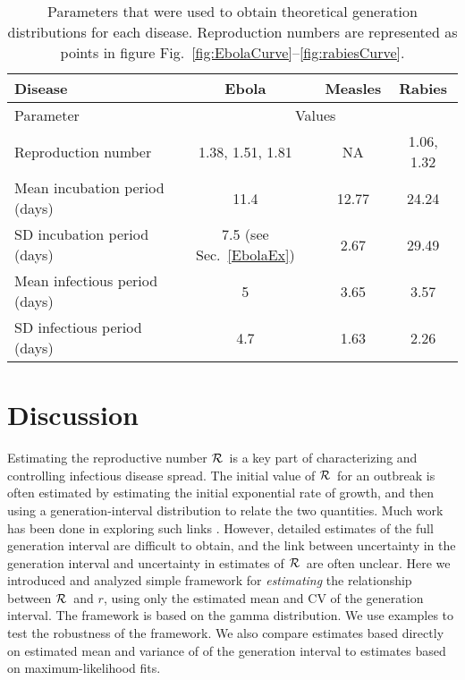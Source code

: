 \documentclass[12pt]{article}
\newcommand{\RR}{\ensuremath{{\cal R}}}
\newcommand{\sref}[1]{Sec.~\ref{#1}}
\newcommand{\frange}[2]{Fig.~\ref{fig:#1}--\ref{fig:#2}}
\newcommand{\tlab}[1]{\label{tab:#1}}
\begin{document}
{\begin{table}[h!]
\centering
\begin{tabular}{l*{3}{c}}
\hline
Disease & Ebola & Measles & Rabies\\
\hline
Parameter & \multicolumn{3}{c}{Values}\\
\hline
Reproduction number & 1.38, 1.51, 1.81 \cite{AylwBarb14} & NA & 1.06, 1.32 \cite{HampDush09} \\
Mean incubation period (days) & 11.4 \cite{AylwBarb14} & 12.77 \cite{LessReic09}  & 24.24 \cite{HampDush09} \\
SD incubation period (days) & 7.5 (see \sref{EbolaEx}) & 2.67 \cite{LessReic09} & 29.49 \cite{HampDush09} \\
Mean infectious period (days) & 5 \cite{AylwBarb14} & 3.65 \cite{Lloy01} & 3.57 \cite{HampDush09} \\
SD infectious period (days) & 4.7 \cite{AylwBarb14} & 1.63 \cite{Lloy01} & 2.26 \cite{HampDush09}
\end{tabular}
\caption{Parameters that were used to obtain theoretical generation distributions for each disease. Reproduction numbers are represented as points in figure \frange{EbolaCurve}{rabiesCurve}.}
\tlab{parameters}
\end{table}

\section{Discussion}

Estimating the reproductive number \RR\ is a key part of characterizing and controlling infectious disease spread. The initial value of \RR\ for an outbreak is often estimated by estimating the initial exponential rate of growth, and then using a generation-interval distribution to relate the two quantities. 
Much work has been done in exploring such links \cite{WallLips07,Sven07,Nish10,Sven15}.
However, detailed estimates of the full generation interval are difficult to obtain, and the link between uncertainty in the generation interval and uncertainty in estimates of \RR\ are often unclear.
Here we introduced and analyzed simple framework for \emph{estimating} the relationship between \RR\ and $r$, using only the estimated mean and CV of the generation interval. The framework is based on the gamma distribution. We use examples to test the robustness of the framework. We also compare estimates based directly on estimated mean and variance of of the generation interval to estimates based on maximum-likelihood fits.

}
\end{document}
